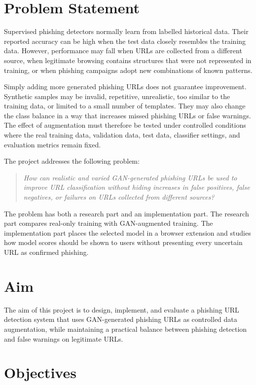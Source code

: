\section{Problem Statement}

Supervised phishing detectors normally learn from labelled historical data.
Their reported accuracy can be high when the test data closely resembles the
training data. However, performance may fall when URLs are collected from a
different source, when legitimate browsing contains structures that were not
represented in training, or when phishing campaigns adopt new combinations of
known patterns.

Simply adding more generated phishing URLs does not guarantee improvement.
Synthetic samples may be invalid, repetitive, unrealistic, too similar to the
training data, or limited to a small number of templates. They may also change
the class balance in a way that increases missed phishing URLs or false warnings.
The effect of augmentation must therefore be tested under controlled conditions
where the real training data, validation data, test data, classifier settings,
and evaluation metrics remain fixed.

The project addresses the following problem:

\begin{quote}
\emph{How can realistic and varied GAN-generated phishing URLs be used to
improve URL classification without hiding increases in false positives, false
negatives, or failures on URLs collected from different sources?}
\end{quote}

The problem has both a research part and an implementation part. The research
part compares real-only training with GAN-augmented training. The implementation
part places the selected model in a browser extension and studies how model
scores should be shown to users without presenting every uncertain URL as
confirmed phishing.

\section{Aim}

The aim of this project is to design, implement, and evaluate a phishing URL
detection system that uses GAN-generated phishing URLs as controlled data
augmentation, while maintaining a practical balance between phishing detection
and false warnings on legitimate URLs.

\section{Objectives}

